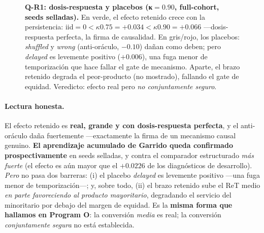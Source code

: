 \documentclass[11pt,a4paper]{article}
\begin{document}
\begin{figure}[H]
\centering
{}
\caption{\textbf{Q-R1: dosis-respuesta y placebos (κ$=0.90$, full-cohort, seeds selladas).} En verde,
el efecto retenido crece con la persistencia: iid$=0 < \kappa0.75=+0.034 < \kappa0.90=+0.066$
—dosis-respuesta perfecta, la firma de causalidad. En gris/rojo, los placebos: \emph{shuffled} y
\emph{wrong} (anti-oráculo, $-0.10$) dañan como deben; pero \emph{delayed} es levemente positivo
($+0.006$), una fuga menor de temporización que hace fallar el gate de mecanismo. Aparte, el brazo
retenido degrada el peor-producto (no mostrado), fallando el gate de equidad. Veredicto: efecto real
pero \emph{no conjuntamente seguro}.}
\label{fig:qr1}
\end{figure}

\paragraph{Lectura honesta.} El efecto retenido es \textbf{real, grande y con dosis-respuesta
perfecta}, y el anti-oráculo daña fuertemente —exactamente la firma de un mecanismo causal genuino.
\textbf{El aprendizaje acumulado de Garrido queda confirmado prospectivamente} en seeds selladas, y
contra el comparador estructurado \emph{más fuerte} (el efecto es aún mayor que el $+0.0226$ de los
diagnósticos de desarrollo). \emph{Pero} no pasa dos barreras: (i) el placebo \emph{delayed} es
levemente positivo —una fuga menor de temporización—; y, sobre todo, (ii) el brazo retenido sube el
ReT medio \emph{en parte favoreciendo al producto mayoritario}, degradando el servicio del minoritario
por debajo del margen de equidad. Es la \textbf{misma forma que hallamos en Program O}: la conversión
\emph{media} es real; la conversión \emph{conjuntamente segura} no está establecida.
\end{document}
